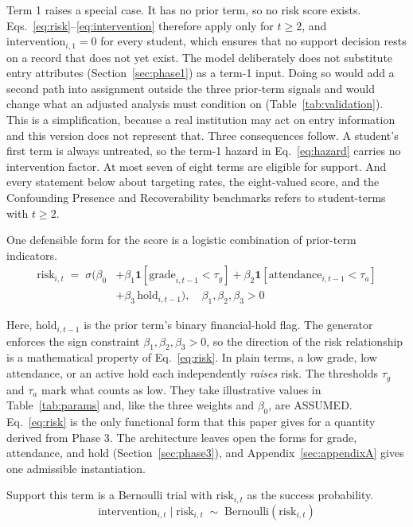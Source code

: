 \documentclass[11pt]{article}
\begin{document}
Term 1 raises a special case. It has no prior term, so no risk score exists. Eqs.~\ref{eq:risk}--\ref{eq:intervention} therefore apply only for $t \ge 2$, and $\text{intervention}_{i,1}=0$ for every student, which ensures that no support decision rests on a record that does not yet exist. The model deliberately does not substitute entry attributes (Section~\ref{sec:phase1}) as a term-1 input. Doing so would add a second path into assignment outside the three prior-term signals and would change what an adjusted analysis must condition on (Table~\ref{tab:validation}). This is a simplification, because a real institution may act on entry information and this version does not represent that. Three consequences follow. A student's first term is always untreated, so the term-1 hazard in Eq.~\ref{eq:hazard} carries no intervention factor. At most seven of eight terms are eligible for support. And every statement below about targeting rates, the eight-valued score, and the Confounding Presence and Recoverability benchmarks refers to student-terms with $t \ge 2$.

One defensible form for the score is a logistic combination of prior-term indicators.
\begin{equation}
\begin{split}
\text{risk}_{i,t} \;=\; \sigma\!\Big(\beta_0 &+ \beta_1 \mathbf{1}[\text{grade}_{i,t-1} < \tau_g] + \beta_2 \mathbf{1}[\text{attendance}_{i,t-1} < \tau_a] \\
&+ \beta_3\, \text{hold}_{i,t-1}\Big), \quad \beta_1,\beta_2,\beta_3 > 0
\end{split}
\label{eq:risk}
\end{equation}

Here, $\text{hold}_{i,t-1}$ is the prior term's binary financial-hold flag. The generator enforces the sign constraint $\beta_1,\beta_2,\beta_3 > 0$, so the direction of the risk relationship is a mathematical property of Eq.~\ref{eq:risk}. In plain terms, a low grade, low attendance, or an active hold each independently \emph{raises} risk. The thresholds $\tau_g$ and $\tau_a$ mark what counts as low. They take illustrative values in Table~\ref{tab:params} and, like the three weights and $\beta_0$, are ASSUMED. Eq.~\ref{eq:risk} is the only functional form that this paper gives for a quantity derived from Phase 3. The architecture leaves open the forms for grade, attendance, and hold (Section~\ref{sec:phase3}), and Appendix~\ref{sec:appendixA} gives one admissible instantiation.

Support this term is a Bernoulli trial with $\text{risk}_{i,t}$ as the success probability.
\begin{equation}
\text{intervention}_{i,t} \mid \text{risk}_{i,t} \;\sim\; \text{Bernoulli}\!\left(\text{risk}_{i,t}\right)
\label{eq:intervention}
\end{equation}
\end{document}
